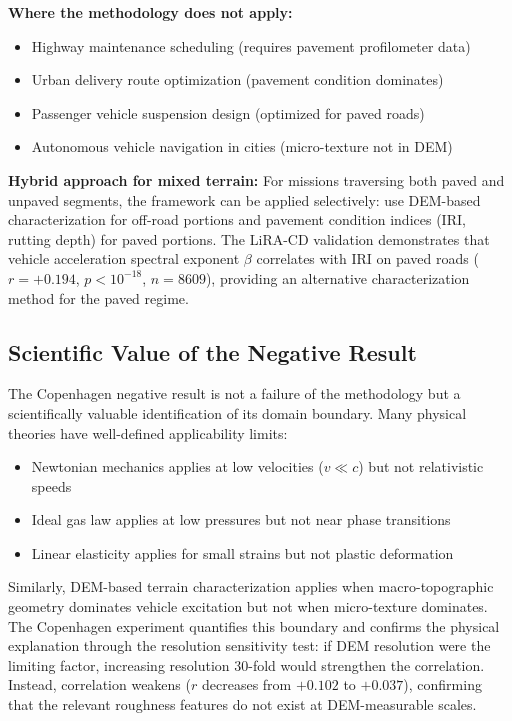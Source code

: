 \documentclass[11pt,letterpaper]{article}
\begin{document}
\textbf{Where the methodology does not apply:}
\begin{itemize}
\item Highway maintenance scheduling (requires pavement profilometer data)
\item Urban delivery route optimization (pavement condition dominates)
\item Passenger vehicle suspension design (optimized for paved roads)
\item Autonomous vehicle navigation in cities (micro-texture not in DEM)
\end{itemize}

\textbf{Hybrid approach for mixed terrain:} For missions traversing both paved and unpaved segments, the framework can be applied selectively: use DEM-based characterization for off-road portions and pavement condition indices (IRI, rutting depth) for paved portions. The LiRA-CD validation demonstrates that vehicle acceleration spectral exponent $\beta$ correlates with IRI on paved roads ($r = +0.194$, $p < 10^{-18}$, $n=8609$), providing an alternative characterization method for the paved regime.

\subsection{Scientific Value of the Negative Result}

The Copenhagen negative result is not a failure of the methodology but a scientifically valuable identification of its domain boundary. Many physical theories have well-defined applicability limits:
\begin{itemize}
\item Newtonian mechanics applies at low velocities ($v \ll c$) but not relativistic speeds
\item Ideal gas law applies at low pressures but not near phase transitions
\item Linear elasticity applies for small strains but not plastic deformation
\end{itemize}

Similarly, DEM-based terrain characterization applies when macro-topographic geometry dominates vehicle excitation but not when micro-texture dominates. The Copenhagen experiment quantifies this boundary and confirms the physical explanation through the resolution sensitivity test: if DEM resolution were the limiting factor, increasing resolution 30-fold would strengthen the correlation. Instead, correlation weakens ($r$ decreases from $+0.102$ to $+0.037$), confirming that the relevant roughness features do not exist at DEM-measurable scales.
\end{document}

